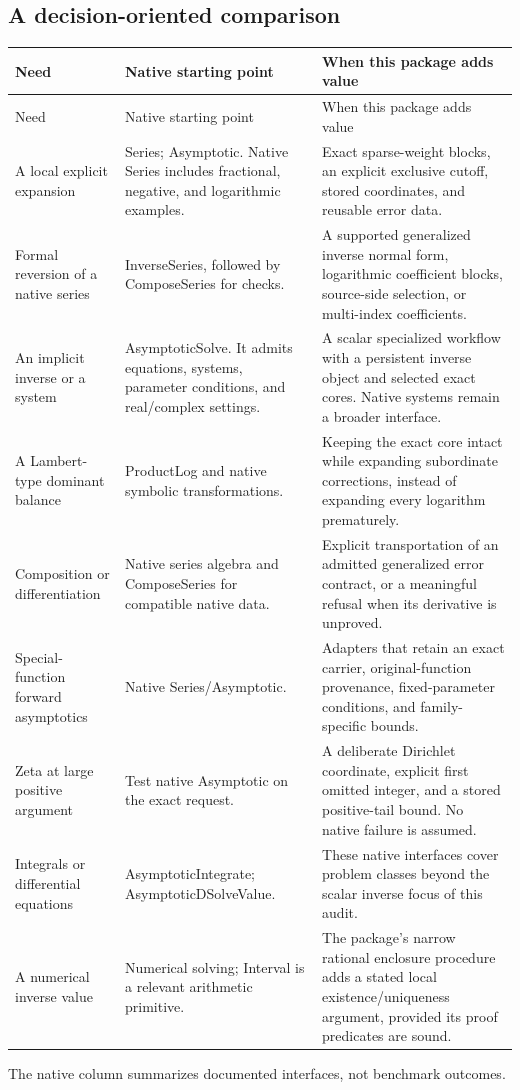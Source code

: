 \documentclass[11pt,a4paper]{article}
\begin{document}
\subsection{A decision-oriented comparison}
\begingroup\small
\begin{longtable}{@{}p{}p{}p{}@{}}
\toprule Need & Native starting point & When this package adds value\\\midrule\endfirsthead
\toprule Need & Native starting point & When this package adds value\\\midrule\endhead
A local explicit expansion & Series; Asymptotic. Native Series includes fractional, negative, and logarithmic examples. & Exact sparse-weight blocks, an explicit exclusive cutoff, stored coordinates, and reusable error data.\\
Formal reversion of a native series & InverseSeries, followed by ComposeSeries for checks. & A supported generalized inverse normal form, logarithmic coefficient blocks, source-side selection, or multi-index coefficients.\\
An implicit inverse or a system & AsymptoticSolve. It admits equations, systems, parameter conditions, and real/complex settings. & A scalar specialized workflow with a persistent inverse object and selected exact cores. Native systems remain a broader interface.\\
A Lambert-type dominant balance & ProductLog and native symbolic transformations. & Keeping the exact core intact while expanding subordinate corrections, instead of expanding every logarithm prematurely.\\
Composition or differentiation & Native series algebra and ComposeSeries for compatible native data. & Explicit transportation of an admitted generalized error contract, or a meaningful refusal when its derivative is unproved.\\
Special-function forward asymptotics & Native Series/Asymptotic. & Adapters that retain an exact carrier, original-function provenance, fixed-parameter conditions, and family-specific bounds.\\
Zeta at large positive argument & Test native Asymptotic on the exact request. & A deliberate Dirichlet coordinate, explicit first omitted integer, and a stored positive-tail bound. No native failure is assumed.\\
Integrals or differential equations & AsymptoticIntegrate; AsymptoticDSolveValue. & These native interfaces cover problem classes beyond the scalar inverse focus of this audit.\\
A numerical inverse value & Numerical solving; Interval is a relevant arithmetic primitive. & The package's narrow rational enclosure procedure adds a stated local existence/uniqueness argument, provided its proof predicates are sound.\\
\bottomrule
\end{longtable}
\endgroup
The native column summarizes documented interfaces, not benchmark outcomes.\cite{wl-series,wl-inverse,wl-compose,wl-asymptotic,wl-solve,wl-productlog,wl-integrate,wl-dsolve,wl-interval}
\end{document}
